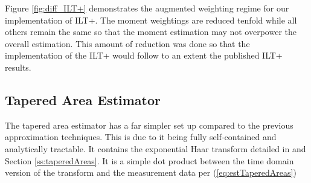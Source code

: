 Figure \ref{fig:diff_ILT+} demonstrates the augmented weighting regime for our implementation of ILT+. The moment weightings are reduced tenfold while all others remain the same so that the moment estimation may not overpower the overall estimation. This amount of reduction was done so that the implementation of the ILT+ would follow to an extent the published ILT+ results.

\subsection{Tapered Area Estimator}
The tapered area estimator has a far simpler set up compared to the previous approximation techniques. This is due to it being fully self-contained and analytically tractable. It contains the exponential Haar transform detailed in \cite{GruberLinearFunctionals2013} and Section \ref{ss:taperedAreas}. It is a simple dot product between the time domain version of the transform and the measurement data per (\ref{eq:estTaperedAreas})

